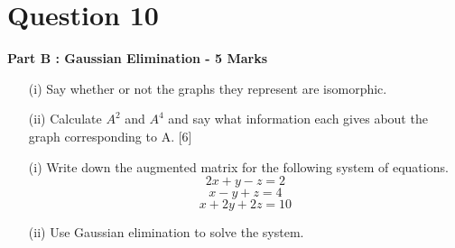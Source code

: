 \documentclass[]{report}
\begin{document}
\section*{Question 10}
%	


\noindent \textbf{Part B : Gaussian Elimination - 5 Marks}\\ 
\begin{itemize}
	\item[(i)] Say whether or not the graphs they represent are isomorphic.
	\item[(ii)] Calculate $A^2$ and $A^4$ and say what information each gives about the graph
	corresponding to A. [6]
\end{itemize}
\begin{itemize}
	\item[(i)] Write down the augmented matrix for the following system of equations.
	\[2x + y - z = 2\]
	\[x - y + z = 4\]
	\[x + 2y + 2z = 10\]
	\item[(ii)] Use Gaussian elimination to solve the system. 
\end{itemize}


\newpage
\end{document}
